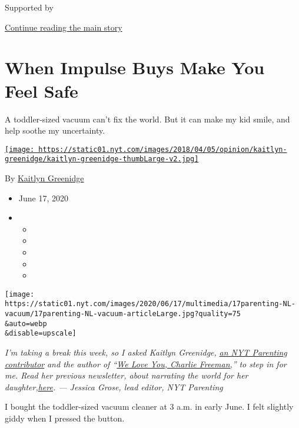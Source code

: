 Supported by

\protect\hyperlink{after-sponsor}{Continue reading the main story}

\hypertarget{when-impulse-buys-make-you-feel-safe}{%
\section{When Impulse Buys Make You Feel
Safe}\label{when-impulse-buys-make-you-feel-safe}}

A toddler-sized vacuum can't fix the world. But it can make my kid
smile, and help soothe my uncertainty.

\href{https://www.nytimes.com/by/kaitlyn-greenidge}{\texttt{[image: https://static01.nyt.com/images/2018/04/05/opinion/kaitlyn-greenidge/kaitlyn-greenidge-thumbLarge-v2.jpg]}}

By \href{https://www.nytimes.com/by/kaitlyn-greenidge}{Kaitlyn
Greenidge}

\begin{itemize}
\item
  June 17, 2020
\item
  \begin{itemize}
  \item
  \item
  \item
  \item
  \item
  \end{itemize}
\end{itemize}

\texttt{[image: https://static01.nyt.com/images/2020/06/17/multimedia/17parenting-NL-vacuum/17parenting-NL-vacuum-articleLarge.jpg?quality=75\\\&auto=webp\\\&disable=upscale]}

\emph{I'm taking a break this week, so I asked Kaitlyn Greenidge,}
\href{https://www.nytimes.com/2020/04/16/parenting/baby/work-conference-life-balance.html}{\emph{an
NYT Parenting contributor}} \emph{and the author of
``}\href{https://www.workman.com/products/we-love-you-charlie-freeman}{\emph{We
Love You, Charlie Freeman,}}\emph{''} \emph{to step in for me. Read her
previous newsletter, about narrating the world for her
daughter,}\href{https://www.nytimes.com/2020/02/26/parenting/making-awkward-small-talk-with-my-baby.html}{\emph{here}}\emph{.
--- Jessica Grose, lead editor, NYT Parenting}

I bought the toddler-sized vacuum cleaner at 3 a.m. in early June. I
felt slightly giddy when I pressed the button.

